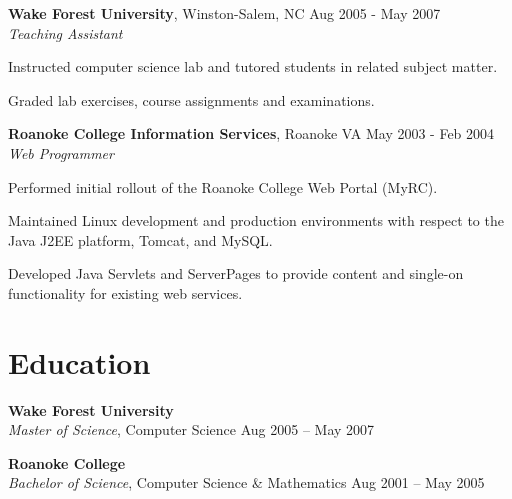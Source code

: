 \documentclass[margin,line]{resume}
\begin{document}
\begin{resume}
  \newpage

  \textbf{Wake Forest University}, Winston-Salem, NC \hfill Aug 2005 - May 2007\vspace{1mm}\\
  \textsl{Teaching Assistant}\\
  \vspace{-3mm}
  \begin{list2}
  \item Instructed computer science lab and tutored students in
    related subject matter.
  \item Graded lab exercises, course assignments and examinations.
  \end{list2}

  \textbf{Roanoke College Information Services}, Roanoke VA  \hfill May 2003 - Feb 2004\vspace{1mm}\\
  \textsl{Web Programmer}\\
  \vspace{-3mm}
  \begin{list2}
  \item Performed initial rollout of the Roanoke College Web Portal (MyRC).
  \item Maintained Linux development and production environments with
    respect to the Java J2EE platform, Tomcat, and MySQL.
  \item Developed Java Servlets and ServerPages to provide content and
    single-on functionality for existing web services.
  \end{list2}



  \section{\mysidestyle \textcolor{mySideColor}{Education}}

  \textbf{Wake Forest University}\vspace{2mm}\\
  \textsl{Master of Science}, Computer Science \hfill Aug 2005 -- May 2007\vspace{-1mm}

  \textbf{Roanoke College}\vspace{2mm}\\
  \textsl{Bachelor of Science}, Computer Science \& Mathematics \hfill Aug 2001 -- May 2005\vspace{-1mm}



\end{resume}
\end{document}

